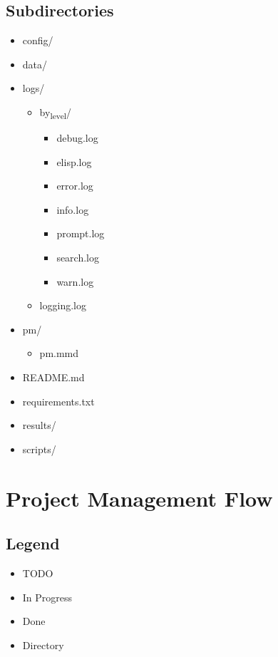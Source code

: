 \documentclass[11pt]{article}
\begin{document}
\subsection{Subdirectories}
\label{sec:orgdc9388b}
\begin{itemize}
\item config/
\item data/
\item logs/
\begin{itemize}
\item by\textsubscript{level}/
\begin{itemize}
\item debug.log
\item elisp.log
\item error.log
\item info.log
\item prompt.log
\item search.log
\item warn.log
\end{itemize}
\item logging.log
\end{itemize}
\item pm/
\begin{itemize}
\item pm.mmd
\end{itemize}
\item README.md
\item requirements.txt
\item results/
\item scripts/
\end{itemize}

\section{Project Management Flow}
\label{sec:org2c0be0d}
\subsection{Legend}
\label{sec:org568c535}
\begin{itemize}
\item TODO
\item In Progress
\item Done
\item Directory
\end{itemize}
\end{document}
